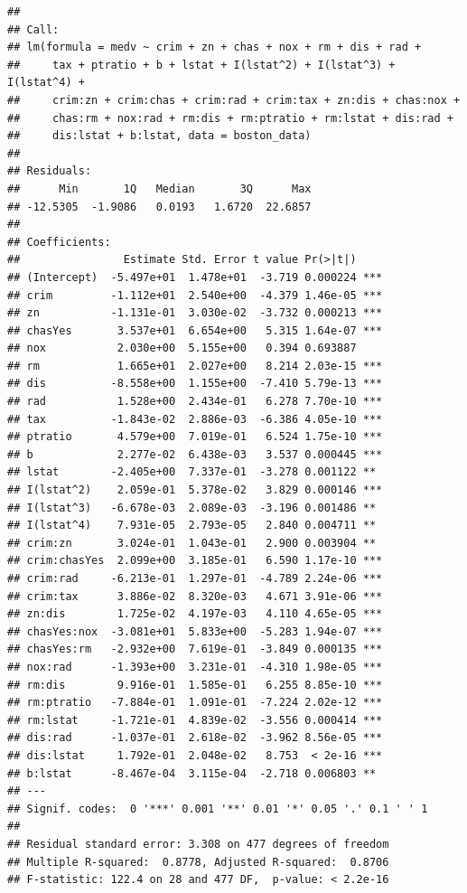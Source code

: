 \documentclass[
]{article}
\begin{document}
\begin{verbatim}
## 
## Call:
## lm(formula = medv ~ crim + zn + chas + nox + rm + dis + rad + 
##     tax + ptratio + b + lstat + I(lstat^2) + I(lstat^3) + I(lstat^4) + 
##     crim:zn + crim:chas + crim:rad + crim:tax + zn:dis + chas:nox + 
##     chas:rm + nox:rad + rm:dis + rm:ptratio + rm:lstat + dis:rad + 
##     dis:lstat + b:lstat, data = boston_data)
## 
## Residuals:
##      Min       1Q   Median       3Q      Max 
## -12.5305  -1.9086   0.0193   1.6720  22.6857 
## 
## Coefficients:
##                Estimate Std. Error t value Pr(>|t|)    
## (Intercept)  -5.497e+01  1.478e+01  -3.719 0.000224 ***
## crim         -1.112e+01  2.540e+00  -4.379 1.46e-05 ***
## zn           -1.131e-01  3.030e-02  -3.732 0.000213 ***
## chasYes       3.537e+01  6.654e+00   5.315 1.64e-07 ***
## nox           2.030e+00  5.155e+00   0.394 0.693887    
## rm            1.665e+01  2.027e+00   8.214 2.03e-15 ***
## dis          -8.558e+00  1.155e+00  -7.410 5.79e-13 ***
## rad           1.528e+00  2.434e-01   6.278 7.70e-10 ***
## tax          -1.843e-02  2.886e-03  -6.386 4.05e-10 ***
## ptratio       4.579e+00  7.019e-01   6.524 1.75e-10 ***
## b             2.277e-02  6.438e-03   3.537 0.000445 ***
## lstat        -2.405e+00  7.337e-01  -3.278 0.001122 ** 
## I(lstat^2)    2.059e-01  5.378e-02   3.829 0.000146 ***
## I(lstat^3)   -6.678e-03  2.089e-03  -3.196 0.001486 ** 
## I(lstat^4)    7.931e-05  2.793e-05   2.840 0.004711 ** 
## crim:zn       3.024e-01  1.043e-01   2.900 0.003904 ** 
## crim:chasYes  2.099e+00  3.185e-01   6.590 1.17e-10 ***
## crim:rad     -6.213e-01  1.297e-01  -4.789 2.24e-06 ***
## crim:tax      3.886e-02  8.320e-03   4.671 3.91e-06 ***
## zn:dis        1.725e-02  4.197e-03   4.110 4.65e-05 ***
## chasYes:nox  -3.081e+01  5.833e+00  -5.283 1.94e-07 ***
## chasYes:rm   -2.932e+00  7.619e-01  -3.849 0.000135 ***
## nox:rad      -1.393e+00  3.231e-01  -4.310 1.98e-05 ***
## rm:dis        9.916e-01  1.585e-01   6.255 8.85e-10 ***
## rm:ptratio   -7.884e-01  1.091e-01  -7.224 2.02e-12 ***
## rm:lstat     -1.721e-01  4.839e-02  -3.556 0.000414 ***
## dis:rad      -1.037e-01  2.618e-02  -3.962 8.56e-05 ***
## dis:lstat     1.792e-01  2.048e-02   8.753  < 2e-16 ***
## b:lstat      -8.467e-04  3.115e-04  -2.718 0.006803 ** 
## ---
## Signif. codes:  0 '***' 0.001 '**' 0.01 '*' 0.05 '.' 0.1 ' ' 1
## 
## Residual standard error: 3.308 on 477 degrees of freedom
## Multiple R-squared:  0.8778, Adjusted R-squared:  0.8706 
## F-statistic: 122.4 on 28 and 477 DF,  p-value: < 2.2e-16
\end{verbatim}
\end{document}
